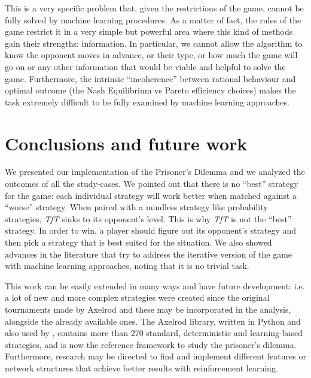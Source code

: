 \documentclass[journal,10pt,twoside]{IEEEtran}
\begin{document}
This is a very specific problem that, given the restrictions of the game, cannot be fully solved by machine learning procedures. As a matter of fact, the rules of the game restrict it in a very simple but powerful area where this kind of methods gain their strengths: information. In particular, we cannot allow the algorithm to know the opponent moves in advance, or their type, or how much the game will go on or any other information that would be viable and helpful to solve the game. Furthermore, the intrinsic ``incoherence'' between rational behaviour and optimal outcome (the Nash Equilibrium vs Pareto efficiency choices) makes the task extremely difficult to be fully examined by machine learning approaches.

\section{Conclusions and future work} \label{s:conc}
We presented our implementation of the Prisoner's Dilemma and we analyzed the outcomes of all the study-cases.
We pointed out that there is no ``best'' strategy for the game: each individual strategy will work better when matched against a ``worse'' strategy. When paired with a mindless strategy like probability strategies, \textit{TfT} sinks to its opponent's level. This is why \textit{TfT} is not the ``best'' strategy. In order to win, a player should figure out its opponent's strategy and then pick a strategy that is best suited for the situation.
We also showed advances in the literature that try to address the iterative version of the game with machine learning approaches, noting that it is no trivial task. 

This work can be easily extended in many ways and have future development: i.e. a lot of new and more complex strategies were created since the original tournaments made by Axelrod and these may be incorporated in the analysis, alongside the already available ones.
The Axelrod library, \cite{Knight2016Axel,axel-lib} written in Python and also used by \cite{plosRLdominant}, contains more than 270 standard, deterministic and learning-based strategies, and is now the reference framework to study the prisoner's dilemma.
Furthermore, research may be directed to find and implement different features or network structures that achieve better results with reinforcement learning.

\balance



\onecolumn
{} \label{s:appendix}
\end{document}
